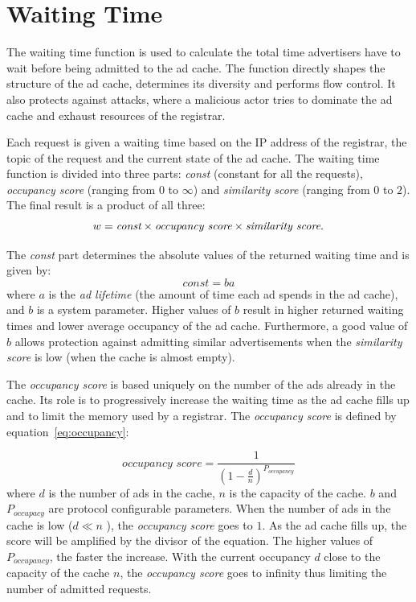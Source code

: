 \section{Waiting Time}
\label{sec:waitingTime}


The waiting time function is used to calculate the total time advertisers have to wait before being admitted to the ad cache. 
The function directly shapes the structure of the ad cache,  determines its diversity and performs flow control. 
It also protects against attacks, where a malicious actor tries to dominate the ad cache and exhaust resources of the registrar. 

Each request is given a waiting time based on the IP address of the registrar, the topic of the request and the current state of the ad cache. 
The waiting time function is divided into three parts: \emph{const} (constant
for all the requests), \emph{occupancy score} (ranging from $0$ to $\infty$)
and  \emph{similarity score} (ranging from $0$ to $2$). The final result is a
product of all three:
\begin{equation}
\label{eq:global}
w = \emph{const} \times \textit{occupancy score} \times \textit{similarity score}. 
\end{equation}

The \emph{const} part determines the absolute values of the returned waiting time and is given by:
\begin{equation}
\label{eq:const}
    \textit{const} = ba
\end{equation}
where $a$ is the \emph{ad lifetime} (the amount of time each ad spends in the
ad cache), and $b$ is a system parameter. Higher values of $b$ result in
higher returned waiting times and lower average occupancy of the ad cache.
Furthermore, a good value of $b$ allows protection against admitting similar advertisements when the \emph{similarity score} is low (\ie when the cache is almost empty).

The \emph{occupancy score} is based uniquely on the number of the ads already in the cache.
Its role is to progressively increase the waiting time as the ad cache fills up and to limit the memory used by a registrar.
The \emph{occupancy score} is defined by equation~\ref{eq:occupancy}:

\begin{equation}
\label{eq:occupancy}
    \textit{occupancy score} = \frac{1}{(1-\frac{d}{n})^{P_{occupancy}}}
\end{equation}
where $d$ is the number of ads in the cache, $n$ is the capacity of the cache. $b$ and $P_{occupacy}$ are protocol configurable parameters. 
When the number of ads in the cache is low ($d \ll n$ ), the \emph{occupancy score} goes to $1$. 
As the ad cache fills up, the score will be amplified by the divisor of the equation. 
The higher values of $P_{occupancy}$, the faster the increase. 
With the current occupancy $d$ close to the capacity of the cache $n$, the \emph{occupancy score} goes to infinity thus limiting the number of admitted requests.

